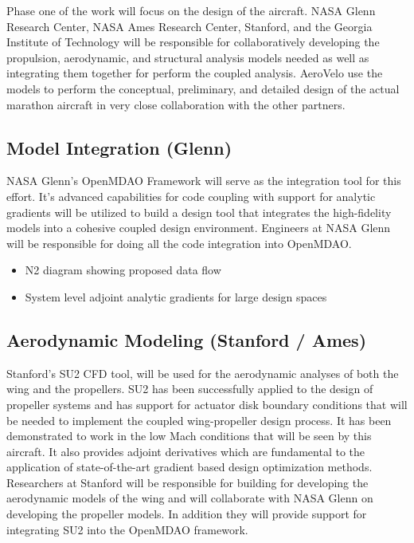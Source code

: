 \documentclass[]{aiaa-tc}
\begin{document}
    Phase one of the work will focus on the design of the aircraft. NASA Glenn Research Center, 
    NASA Ames Research Center, Stanford, and the Georgia Institute of Technology will be responsible 
    for collaboratively developing the propulsion, aerodynamic, and structural analysis 
    models needed as well as integrating them together for perform the coupled analysis. AeroVelo 
    use the models to perform the conceptual, preliminary, and detailed design of the actual marathon 
    aircraft in very close collaboration with the other partners. 

    \subsection{Model Integration (Glenn)}

    NASA Glenn's OpenMDAO Framework will serve as the integration tool for this effort. It's advanced 
    capabilities for code coupling with support for analytic gradients will be utilized to build 
    a design tool that integrates the high-fidelity models into a cohesive coupled design environment. 
    Engineers at NASA Glenn will be responsible for doing all the code integration into OpenMDAO. 

    \begin{itemize}
        \item N2 diagram showing proposed data flow
        \item System level adjoint analytic gradients for large design spaces
    \end{itemize}

    

    \subsection{Aerodynamic Modeling (Stanford / Ames)}

    Stanford's SU2 CFD tool, will be used for the aerodynamic analyses of both the wing and 
    the propellers. SU2 has been successfully applied to the design of propeller systems 
    and has support for actuator disk boundary conditions that will be needed to implement 
    the coupled wing­-propeller design process. It has been demonstrated to work in the low 
    Mach conditions that will be seen by this aircraft. It also provides adjoint derivatives 
    which are fundamental to the application of state­-of-­the-­art gradient based design 
    optimization methods. Researchers at Stanford will be responsible for building for developing 
    the aerodynamic models of the wing and will collaborate with NASA Glenn on developing the 
    propeller models. In addition they will provide support for integrating SU2 into the OpenMDAO 
    framework. 
\end{document}
